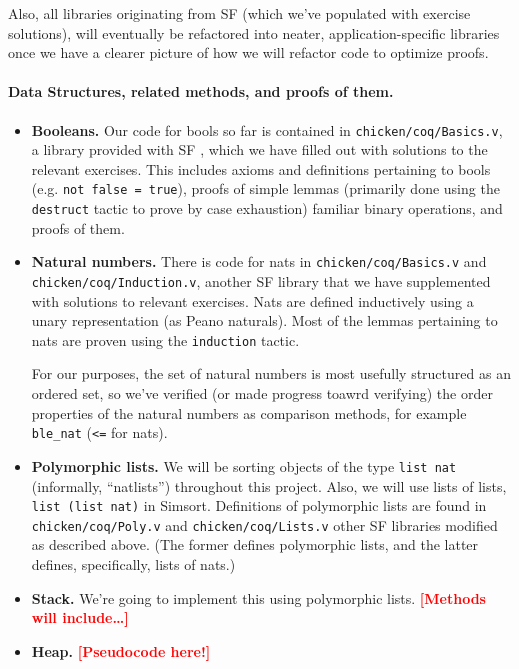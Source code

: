 \documentclass{article}
\newcommand{\todo}[1]{\textcolor{red}{\textbf{\textsf{[#1]}}}}
\begin{document}
Also, all libraries originating from SF \cite{sf} (which we've populated
with exercise solutions), will eventually be refactored into neater,
application-specific libraries once we have a clearer picture of how
we will refactor code to optimize proofs.

\paragraph{Data Structures, related methods, and proofs of them.}

\begin{itemize}
  \item \textbf{Booleans.}
Our code for bools so far is contained in \verb`chicken/coq/Basics.v`,
a library provided with SF \cite{sf}, which we have filled out with solutions
to the relevant exercises.
This includes axioms and definitions pertaining to bools
(e.g. \verb+not false = true+), proofs of simple lemmas (primarily done
using the \verb+destruct+ tactic to prove by case exhaustion)
familiar binary operations, and proofs of them.

  \item \textbf{Natural numbers.}
    There is code for nats in \verb|chicken/coq/Basics.v| and
    \verb|chicken/coq/Induction.v|, another SF library that we have
    supplemented with solutions to relevant exercises.
    Nats are defined inductively using a unary representation
    (as Peano naturals).
    Most of the lemmas pertaining to nats are proven using
    the \verb+induction+ tactic.

    For our purposes, the set of natural numbers is most usefully
    structured as an ordered set, so we've verified (or made progress
    toawrd verifying) the order properties of the natural numbers
    as comparison methods, for example
    \verb`ble_nat` (\verb`<=` for nats).

  \item \textbf{Polymorphic lists.}
We will be sorting objects of the type \verb`list nat` (informally,
``natlists'') throughout this project.
Also, we will use lists of lists, \verb`list (list nat)` in Simsort.
Definitions of polymorphic lists are found in \verb`chicken/coq/Poly.v`
and \verb`chicken/coq/Lists.v`
other SF libraries modified as described above.
(The former defines polymorphic lists,
and the latter defines, specifically, lists of nats.)

  \item \textbf{Stack.}
    We're going to implement this using polymorphic lists.
    \todo{Methods will include\dots}

  \item \textbf{Heap.}
    \todo{Pseudocode here!}

\end{itemize}
\end{document}
